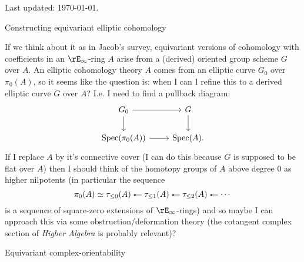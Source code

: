 



\thispagestyle{fancy}

\begin{flushleft}
  Last updated: \today.
\end{flushleft}

\medskip

\begin{ideas}


\item Constructing equivariant elliptic cohomology

  \begin{ideas}
  \item If we think about it as in Jacob's survey, equivariant
    versions of cohomology with coefficients in an $\rE_\infty$-ring
    $A$ arise from a (derived) oriented group scheme $G$ over $A$. An
    elliptic cohomology theory $A$ comes from an elliptic curve $G_0$
    over $\pi_0(A)$, so it seems like the question is: when I can I
    refine this to a derived elliptic curve $G$ over $A$? I.e. I need
    to find a pullback diagram:
    \[
    \begin{tikzcd}
      G_0 \ar[r] \ar[d] & G \ar[d] \\
      \Spec(\pi_0(A)) \ar[r] & \Spec(A).
    \end{tikzcd}
    \]
    If I replace $A$ by it's connective cover (I can do this because
    $G$ is supposed to be flat over $A$) then I should think of the
    homotopy groups of $A$ above degree $0$ as higher nilpotents (in
    particular the sequence
    \[
    \pi_0(A) \iso \tau_{\le 0}(A) \from \tau_{\le 1}(A) \from
    \tau_{\le 2}(A) \from \cdots
    \]
    is a sequence of square-zero extensions of $\rE_\infty$-rings) and
    so maybe I can approach this via some obstruction/deformation
    theory (the cotangent complex section of \emph{Higher Algebra} is
    probably relevant)?
  \end{ideas}


\item Equivariant complex-orientability


\end{ideas}
